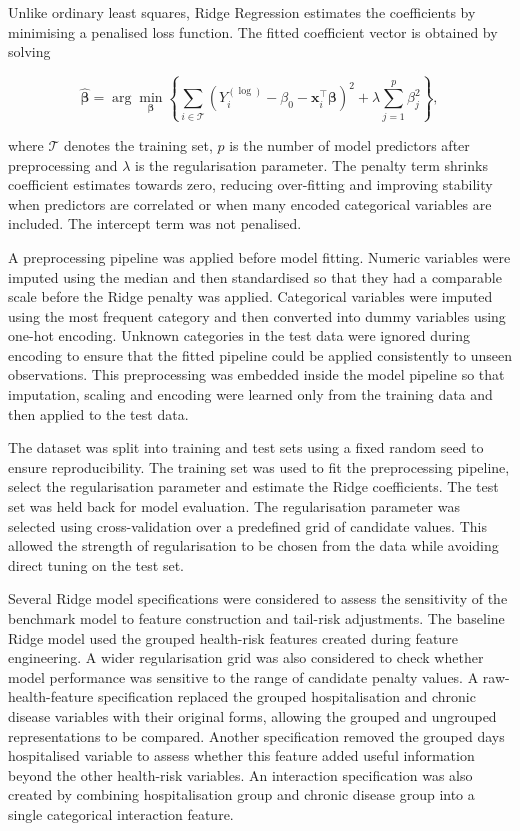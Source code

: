 \documentclass[11pt]{article}
\begin{document}
	Unlike ordinary least squares, Ridge Regression estimates the coefficients by minimising a penalised loss function. The fitted coefficient vector is obtained by solving
	
	\begin{equation}
		\hat{\boldsymbol{\beta}}
		=
		\arg\min_{\boldsymbol{\beta}}
		\left\{
		\sum_{i \in \mathcal{T}}
		\left(
		Y_i^{(\log)} - \beta_0 - \mathbf{x}_i^{\top}\boldsymbol{\beta}
		\right)^2
		+
		\lambda
		\sum_{j=1}^{p}
		\beta_j^2
		\right\},
	\end{equation}
	
	where \(\mathcal{T}\) denotes the training set, \(p\) is the number of model predictors after preprocessing and \(\lambda\) is the regularisation parameter. The penalty term shrinks coefficient estimates towards zero, reducing over-fitting and improving stability when predictors are correlated or when many encoded categorical variables are included. The intercept term was not penalised.
	
	A preprocessing pipeline was applied before model fitting. Numeric variables were imputed using the median and then standardised so that they had a comparable scale before the Ridge penalty was applied. Categorical variables were imputed using the most frequent category and then converted into dummy variables using one-hot encoding. Unknown categories in the test data were ignored during encoding to ensure that the fitted pipeline could be applied consistently to unseen observations. This preprocessing was embedded inside the model pipeline so that imputation, scaling and encoding were learned only from the training data and then applied to the test data.
	
	The dataset was split into training and test sets using a fixed random seed to ensure reproducibility. The training set was used to fit the preprocessing pipeline, select the regularisation parameter and estimate the Ridge coefficients. The test set was held back for model evaluation. The regularisation parameter was selected using cross-validation over a predefined grid of candidate values. This allowed the strength of regularisation to be chosen from the data while avoiding direct tuning on the test set.
	
	Several Ridge model specifications were considered to assess the sensitivity of the benchmark model to feature construction and tail-risk adjustments. The baseline Ridge model used the grouped health-risk features created during feature engineering. A wider regularisation grid was also considered to check whether model performance was sensitive to the range of candidate penalty values. A raw-health-feature specification replaced the grouped hospitalisation and chronic disease variables with their original forms, allowing the grouped and ungrouped representations to be compared. Another specification removed the grouped days hospitalised variable to assess whether this feature added useful information beyond the other health-risk variables. An interaction specification was also created by combining hospitalisation group and chronic disease group into a single categorical interaction feature.
	
\end{document}

